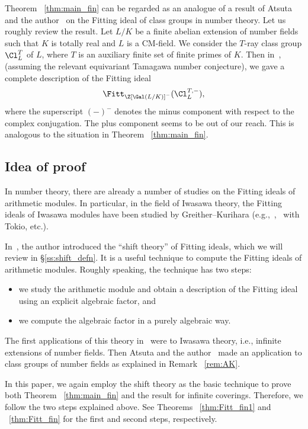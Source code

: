 \begin{rema}\label{rem:AK}
Theorem ~\ref{thm:main_fin} can be regarded as an analogue of a result of Atsuta and the author~\cite{AK21} on the Fitting ideal of class groups in number theory.
Let us roughly review the result.
Let $L/K$ be a finite abelian extension of number fields such that $K$ is totally real and $L$ is a CM-field.
We consider the $T$-ray class group $\Cl_L^T$ of $L$, where $T$ is an auxiliary finite set of finite primes of $K$.
Then in~\cite{AK21}, (assuming the relevant equivariant Tamagawa number conjecture), we gave a complete description of the Fitting ideal
\[
\Fitt_{\Z[\Gal(L/K)]^-}(\Cl_L^{T, -}),
\]
where the superscript $(-)^-$ denotes the minus component with respect to the complex conjugation.
The plus component seems to be out of our reach.
This is analogous to the situation in Theorem ~\ref{thm:main_fin}.
\end{rema}

\subsection{Idea of proof}\label{ss:comments}

In number theory, there are already a number of studies on the Fitting ideals of arithmetic modules.
In particular, in the field of Iwasawa theory, the Fitting ideals of Iwasawa modules have been studied by Greither--Kurihara (e.g.,~\cite{GK15},~\cite{GKT20} with Tokio, etc.).

In~\cite{Kata_05}, the author introduced the ``shift theory'' of Fitting ideals, which we will review in \S\ref{ss:shift_defn}.
It is a useful technique to compute the Fitting ideals of arithmetic modules.
Roughly speaking, the technique has two steps: 
\begin{itemize}
\item[(1)]
we study the arithmetic module and obtain a description of the Fitting ideal using an explicit algebraic factor, and 
\item[(2)]
we compute the algebraic factor in a purely algebraic way.
\end{itemize}
The first applications of this theory in~\cite{Kata_05} were to Iwasawa theory, i.e., infinite extensions of number fields.
Then Atsuta and the author~\cite{AK21} made an application to class groups of number fields as explained in Remark ~\ref{rem:AK}.

In this paper, we again employ the shift theory as the basic technique to prove both Theorem ~\ref{thm:main_fin} and the result for infinite coverings.
Therefore, we follow the two steps explained above.
See Theorems ~\ref{thm:Fitt_fin1} and ~\ref{thm:Fitt_fin} for the first and second steps, respectively.

